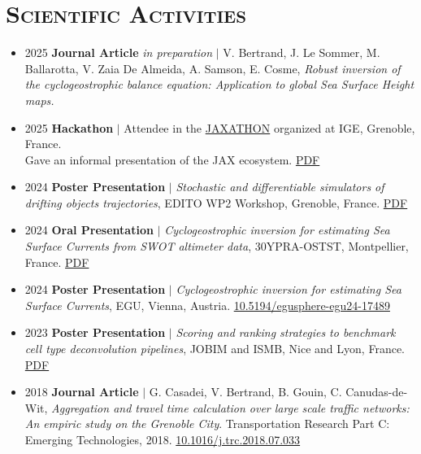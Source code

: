 \documentclass{article}
\begin{document}
\section*{\textsc{Scientific Activities}}
\begin{itemize}
    \item[] 2025 \tabto{2cm} \textbf{Journal Article} \textit{in preparation} $\vert$ V. Bertrand, J. Le Sommer, M. Ballarotta, V. Zaia De Almeida, A. \tabto{2cm} Samson, E. Cosme, \textit{Robust inversion of the cyclogeostrophic balance equation: Application to global Sea \tabto{2cm} Surface Height maps.}

    \item[] 2025 \tabto{2cm} \textbf{Hackathon} $\vert$ Attendee in the \href{https://github.com/Diff4Earth/ige-jaxathon-2025}{JAXATHON} organized at IGE, Grenoble, France. \\[.1 cm]
        \tabto{2cm} Gave an informal presentation of the JAX ecosystem. \href{https://vadmbertr.github.io/material/presentations/2025-03-jaxathon.pdf}{PDF}

    \item[] 2024 \tabto{2cm} \textbf{Poster Presentation} $\vert$ \textit{Stochastic and differentiable simulators of drifting objects trajectories}, EDITO \tabto{2cm} WP2 Workshop, Grenoble, France. \href{https://vadmbertr.github.io/material/posters/2024-10_EDITO_Bertrand.pdf}{PDF}
    
    \item[] 2024 \tabto{2cm} \textbf{Oral Presentation} $\vert$ \textit{Cyclogeostrophic inversion for estimating Sea Surface Currents from SWOT \tabto{2cm} altimeter data}, 30YPRA-OSTST, Montpellier, France. \href{https://vadmbertr.github.io/material/presentations/2.4-5-Bertrand.pdf}{PDF}
    
    \item[] 2024 \tabto{2cm} \textbf{Poster Presentation} $\vert$ \textit{Cyclogeostrophic inversion for estimating Sea Surface Currents}, EGU, Vienna, \tabto{2cm} Austria. \href{https://doi.org/10.5194/egusphere-egu24-17489}{10.5194/egusphere-egu24-17489}
    
    \item[] 2023 \tabto{2cm} \textbf{Poster Presentation} $\vert$ \textit{Scoring and ranking strategies to benchmark cell type deconvolution pipelines}, \tabto{2cm} JOBIM and ISMB, Nice and Lyon, France. \href{https://vadmbertr.github.io/material/posters/poster_jobim_ismb.pdf}{PDF}
    
    \item[] 2018 \tabto{2cm} \textbf{Journal Article} $\vert$ G. Casadei, V. Bertrand, B. Gouin, C. Canudas-de-Wit, \textit{Aggregation and travel time \tabto{2cm} calculation over large scale traffic networks: An empiric study on the Grenoble City}. Transportation \tabto{2cm} Research Part C: Emerging Technologies, 2018. \href{https://doi.org/10.1016/j.trc.2018.07.033}{10.1016/j.trc.2018.07.033}
\end{itemize}
\end{document}
